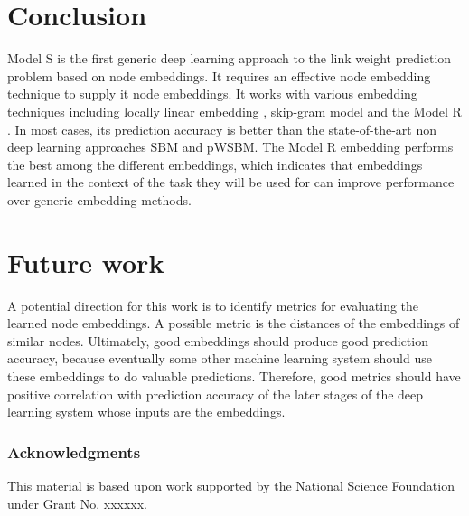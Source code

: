 \documentclass{article} %
\begin{document}
\section{Conclusion}
Model S is the first generic deep learning approach to the link weight prediction problem based on node embeddings.
It requires an effective node embedding technique to supply it node embeddings.
It works with various embedding techniques including locally linear embedding \citep{roweis2000nonlinear}, skip-gram model \citep{grover2016node2vec} and the Model R \citep{hou2017deep}.
In most cases, its prediction accuracy is better than the state-of-the-art non deep learning approaches SBM and pWSBM.
The Model R embedding performs the best among the different embeddings, which indicates that embeddings learned in the context of the task they will be used for can improve performance over generic embedding methods.

\section{Future work}
A potential direction for this work is to identify metrics for evaluating the learned node embeddings.
A possible metric is the distances of the embeddings of similar nodes.
Ultimately, good embeddings should produce good prediction accuracy,
because eventually some other machine learning system should use these embeddings to do valuable predictions.
Therefore, good metrics should have positive correlation with prediction accuracy of the later stages of the deep learning system whose inputs are the embeddings.

\subsubsection*{Acknowledgments}
This material is based upon work supported by the National Science Foundation under Grant No. xxxxxx.



\end{document}
